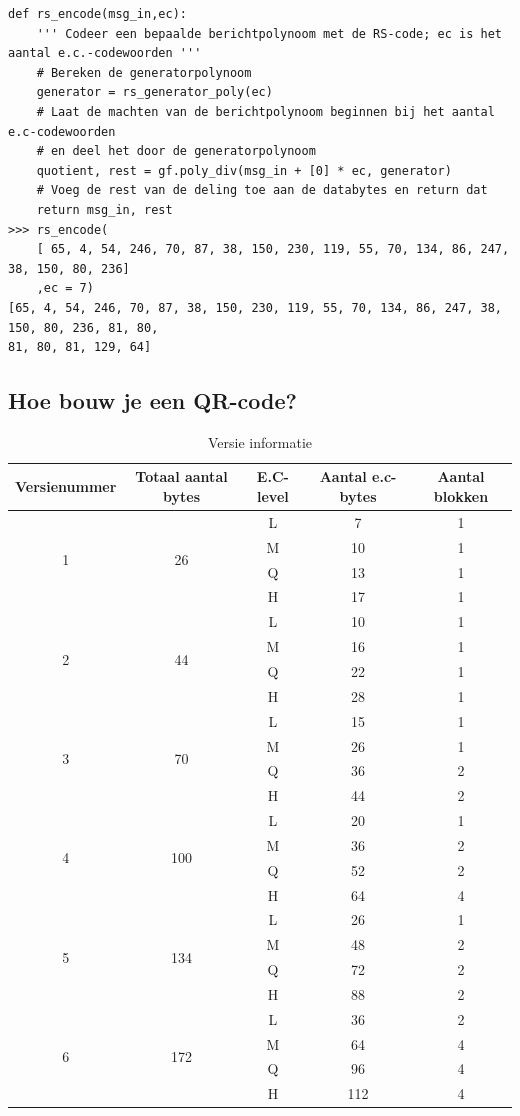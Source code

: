 \documentclass[a4paper]{article}
\begin{document}
\begin{verbatim}
def rs_encode(msg_in,ec):
    ''' Codeer een bepaalde berichtpolynoom met de RS-code; ec is het aantal e.c.-codewoorden '''
    # Bereken de generatorpolynoom
    generator = rs_generator_poly(ec)
    # Laat de machten van de berichtpolynoom beginnen bij het aantal e.c-codewoorden
    # en deel het door de generatorpolynoom
    quotient, rest = gf.poly_div(msg_in + [0] * ec, generator)
    # Voeg de rest van de deling toe aan de databytes en return dat
    return msg_in, rest
>>> rs_encode(
    [ 65, 4, 54, 246, 70, 87, 38, 150, 230, 119, 55, 70, 134, 86, 247, 38, 150, 80, 236]
    ,ec = 7)
[65, 4, 54, 246, 70, 87, 38, 150, 230, 119, 55, 70, 134, 86, 247, 38, 150, 80, 236, 81, 80,
81, 80, 81, 129, 64]
\end{verbatim}

\subsection{Hoe bouw je een QR-code?}

\begin{table}[H]
\centering
\setlength{\tabcolsep}{5pt}
\def\arraystretch{1.2}
\begin{tabular}{|c|c|c|c|c|}
\hline
\bfseries Versienummer & \bfseries Totaal aantal bytes & \bfseries E.C-level & \bfseries Aantal e.c-bytes & \bfseries Aantal blokken\\\hline
\multirow{4}{*}{1} & \multirow{4}{*}{26} &
L & 7  & 1\\&&
M & 10 & 1\\&&
Q & 13 & 1\\&&
H & 17 & 1\\\hline
\multirow{4}{*}{2} & \multirow{4}{*}{44} &
L & 10 & 1\\&&
M & 16 & 1\\&&
Q & 22 & 1\\&&
H & 28 & 1\\\hline
\multirow{4}{*}{3} & \multirow{4}{*}{70} &
L & 15 & 1\\&&
M & 26 & 1\\&&
Q & 36 & 2\\&&
H & 44 & 2\\\hline
\multirow{4}{*}{4} & \multirow{4}{*}{100} &
L & 20 & 1\\&&
M & 36 & 2\\&&
Q & 52 & 2\\&&
H & 64 & 4\\\hline
\multirow{4}{*}{5} & \multirow{4}{*}{134} &
L & 26 & 1\\&&
M & 48 & 2\\&&
Q & 72 & 2\\&&
H & 88 & 2\\\hline
\multirow{4}{*}{6} & \multirow{4}{*}{172} &
L & 36 & 2\\&&
M & 64 & 4\\&&
Q & 96 & 4\\&&
H & 112& 4\\\hline
\end{tabular}
\caption{Versie informatie}
\label{table:versie-info}
\end{table}
\end{document}
